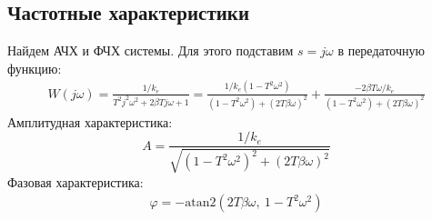 \subsection{Частотные характеристики}
Найдем АЧХ и ФЧХ системы. Для этого подставим $s = j\omega$ в передаточную функцию:
\begin{eqnarray}
    W(j\omega) =  \frac{1/k_e}{T^2j^2\omega^2 + 2\beta Tj\omega + 1} = \frac{1/k_e(1 - T^2\omega^2)}{(1 - T^2\omega^2) + (2T\beta\omega)^2} + \frac{-2\beta T\omega/k_e}{(1 - T^2\omega^2) + (2T\beta\omega)^2}
\end{eqnarray}
Амплитудная характеристика:
\begin{equation}
    A = \frac{1/k_e}{\sqrt{(1 - T^2\omega^2)^2 + (2T\beta\omega)^2}}
\end{equation}
Фазовая характеристика:
\begin{eqnarray}
    \varphi = -\text{atan2}\left(2T\beta\omega,~1 - T^2\omega^2\right)
\end{eqnarray}


